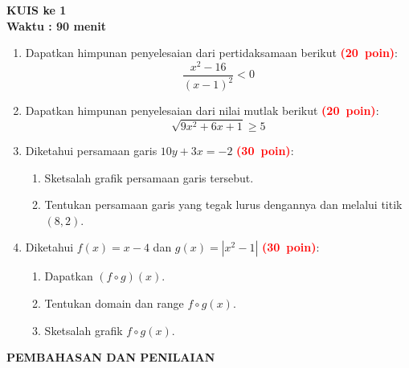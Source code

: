 \documentclass[12pt,a4paper]{article}
\newcommand{\bobot}[1]{\mbox{\textcolor{red}{\textbf{(#1 poin)}}}}
\begin{document}
\begin{center}
  \textbf{\Large KUIS ke 1}\\[0.5cm]
  \textbf{\large Waktu : 90 menit}
\end{center}
\vspace{0.5cm}

\begin{enumerate}
  \item Dapatkan himpunan penyelesaian dari pertidaksamaan berikut
        \bobot{20}:
        \[
          \frac{x^2-16}{(x-1)^2}<0
        \]

  \item Dapatkan himpunan penyelesaian dari nilai mutlak berikut
        \bobot{20}:
        \[
          \sqrt{9x^2+6x+1}\geq 5
        \]

  \item Diketahui persamaan garis $10y+3x=-2$ \bobot{30}:
        \begin{enumerate}[label=\alph*.]
          \item Sketsalah grafik persamaan garis tersebut.
          \item Tentukan persamaan garis yang tegak lurus dengannya dan melalui titik $(8,2)$.
        \end{enumerate}

  \item Diketahui $f(x)=x-4$ dan $g(x)=|x^2-1|$ \bobot{30}:
        \begin{enumerate}[label=\alph*.]
          \item Dapatkan $(f\circ g)(x)$.
          \item Tentukan domain dan range $f\circ g(x)$.
          \item Sketsalah grafik $f\circ g(x)$.
        \end{enumerate}
\end{enumerate}

\newpage
\begin{center}
  \textbf{\Large PEMBAHASAN DAN PENILAIAN}
\end{center}
\vspace{0.3cm}
\end{document}
